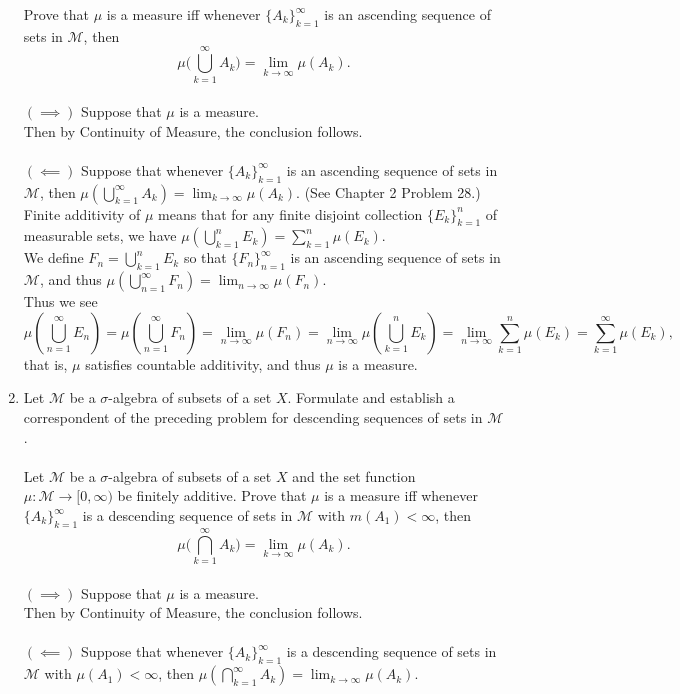 \begin{enumerate}
	Prove that $\mu$ is a measure iff whenever $\{A_k\}_{k=1}^\infty$ is an ascending sequence of sets in $\mathcal{M}$, then
	\[
	\mu \biggl ( \bigcup_{k=1}^\infty A_k \biggr ) = \lim_{k \to \infty} \mu(A_k).	
	\]
	\\$(\implies)$ Suppose that $\mu$ is a measure.\\
	Then by Continuity of Measure, the conclusion follows.\\
	\\$(\impliedby)$ Suppose that whenever $\{A_k\}_{k=1}^\infty$ is an ascending sequence of sets in $\mathcal{M}$, then $\mu ( \bigcup_{k=1}^\infty A_k ) = \lim_{k \to \infty} \mu(A_k)$.
	(See Chapter 2 Problem 28.)\\
	Finite additivity of $\mu$ means that for any finite disjoint collection $\{E_k\}_{k=1}^n$ of measurable sets, we have $\mu(\bigcup_{k=1}^n E_k)=\sum_{k=1}^n\mu(E_k)$.
	\\We define $F_n=\bigcup_{k=1}^n E_k$ so that $\{F_n\}_{n=1}^\infty$ is an ascending sequence of sets in $\mathcal{M}$, and thus $\mu ( \bigcup_{n=1}^\infty F_n ) = \lim_{n \to \infty} \mu(F_n)$.
	\\Thus we see
	\[
		\mu(\bigcup_{n=1}^\infty E_n)=\mu(\bigcup_{n=1}^\infty F_n)=\lim_{n \to \infty} \mu(F_n)=\lim_{n \to \infty} \mu(\bigcup_{k=1}^n E_k)=\lim_{n \to \infty}\sum_{k=1}^n\mu(E_k)=\sum_{k=1}^\infty\mu(E_k),
	\]
	that is, $\mu$ satisfies countable additivity, and thus $\mu$ is a measure.
	\item Let $\mathcal{M}$ be a $\sigma$-algebra of subsets of a set $X$. Formulate and establish a correspondent of the preceding problem for descending sequences of sets in $\mathcal{M}$.\\
	\\Let $\mathcal{M}$ be a $\sigma$-algebra of subsets of a set $X$ and the set function $\mu : \mathcal{M} \to [0,\infty)$ be finitely additive.
	Prove that $\mu$ is a measure iff whenever $\{A_k\}_{k=1}^\infty$ is a descending sequence of sets in $\mathcal{M}$ with $m(A_1)<\infty$, then
	\[
	\mu \biggl ( \bigcap_{k=1}^\infty A_k \biggr ) = \lim_{k \to \infty} \mu(A_k).	
	\]
	\\$(\implies)$ Suppose that $\mu$ is a measure.\\
	Then by Continuity of Measure, the conclusion follows.\\
	\\$(\impliedby)$ Suppose that whenever $\{A_k\}_{k=1}^\infty$ is a descending sequence of sets in $\mathcal{M}$ with $\mu(A_1)<\infty$, then $\mu ( \bigcap_{k=1}^\infty A_k ) = \lim_{k \to \infty} \mu(A_k)$.\\

\end{enumerate}
